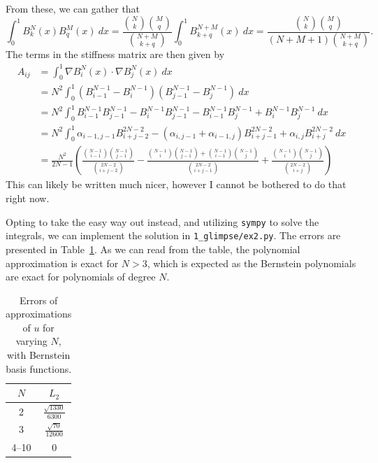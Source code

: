 \begin{solution}
    From these, we can gather that
    \begin{equation*}
        \int_{0}^{1} B_k^N(x) B_q^M(x) \ dx = \frac{\binom{N}{k}\binom{M}{q}}{\binom{N + M}{k + q}} \int_0^1 B_{k+q}^{N + M}(x) \ dx = \frac{\binom{N}{k}\binom{M}{q}}{(N + M + 1) \binom{N + M}{k + q}}.
    \end{equation*}
    The terms in the stiffness matrix are then given by
    \begin{align*}
        A_{ij} &= \int_{0}^{1} \nabla B_i^N(x) \cdot \nabla B_{j}^N(x) \ dx \\
        &= N^2 \int_{0}^{1} \left( B_{i-1}^{N - 1} - B_{i}^{N - 1} \right) \left( B_{j-1}^{N - 1} - B_{j}^{N - 1} \right) \ dx \\
        &= N^2
        \int_{0}^{1} B_{i-1}^{N - 1} B_{j-1}^{N - 1}
        - B_{i}^{N - 1} B_{j-1}^{N - 1}
        - B_{i-1}^{N - 1} B_{j}^{N - 1}
        + B_{i}^{N - 1} B_{j}^{N - 1} \ dx
        \\
        &= N^2 \int_{0}^{1} \alpha_{i-1, j-1} B_{i+j-2}^{2N-2} - (\alpha_{i,j-1} + \alpha_{i-1, j}) B_{i+j-1}^{2N - 2} + \alpha_{i,j} B_{i+j}^{2N - 2} \ dx \\
        &= \frac{N^2}{2N - 1} \left(
            \frac{\binom{N-1}{i-1}\binom{N-1}{j-1}}{\binom{2N - 2}{i + j - 2}}
            - \frac{
                \binom{N-1}{i}\binom{N-1}{j-1}
                + \binom{N-1}{i-1}\binom{N-1}{j}
            }{\binom{2N - 2}{i + j - 1}}
            + \frac{\binom{N-1}{i}\binom{N-1}{j}}{\binom{2N - 2}{i + j}}
        \right)
    \end{align*}
    This can likely be written much nicer, however I cannot be bothered to do that right now.

    Opting to take the easy way out instead, and utilizing \verb|sympy| to solve the integrals, we can implement the solution in \verb|1_glimpse/ex2.py|.
    The errors are presented in Table~\ref{tab:1_2}.
    As we can read from the table, the polynomial approximation is exact for $N > 3$, which is expected as the Bernstein polynomials are exact for polynomials of degree $N$.

    \begin{table}[!ht]
        \centering
        \caption{Errors of approximations of $u$ for varying $N$, with Bernstein basis functions.\label{tab:1_2}}
        \begin{tabular}{cc}
            \toprule
            $N$ & $L_2$ \\
            \midrule
            2 & $\frac{\sqrt{1330}}{6300}$ \\
            3 & $\frac{\sqrt{70}}{12600}$ \\
            4--10 & 0 \\
            \bottomrule
        \end{tabular}
    \end{table}
\end{solution}

